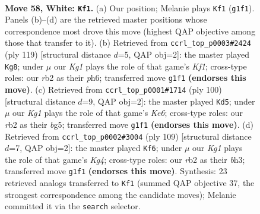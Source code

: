 \documentclass[11pt]{article}
\begin{document}
\clearpage

\begin{figure}[p]\centering
\begin{subfigure}{0.46\textwidth}\centering
\resizebox{\linewidth}{!}{%
\newchessgame
\chessboard[
  setfen={6k1/8/8/4p1p1/5p2/5B2/1r6/6K1 w - - 27 58},
  showmover=false,
  pgfstyle=straightmove, color=movearrow, markmove={g1-f1}
]}
\caption{}
\end{subfigure}\hfill
\begin{subfigure}{0.46\textwidth}\centering
\resizebox{\linewidth}{!}{%
\newchessgame
\chessboard[
  setfen={5k2/8/4K2P/6P1/5P2/8/1b6/8 b - - 0 60},
  showmover=false,
  pgfstyle=straightmove, color=movearrow, markmove={f8-g8}
]}
\caption{}
\end{subfigure}
\\[4pt]
\begin{subfigure}{0.46\textwidth}\centering
\resizebox{\linewidth}{!}{%
\newchessgame
\chessboard[
  setfen={8/7k/4K3/1p4b1/2pB4/8/8/8 w - - 6 51},
  showmover=false,
  pgfstyle=straightmove, color=movearrow, markmove={e6-d5}
]}
\caption{}
\end{subfigure}\hfill
\begin{subfigure}{0.46\textwidth}\centering
\resizebox{\linewidth}{!}{%
\newchessgame
\chessboard[
  setfen={8/8/1b1p4/1P1P2k1/2P5/5K1B/8/8 b - - 0 55},
  showmover=false,
  pgfstyle=straightmove, color=movearrow, markmove={g5-f6}
]}
\caption{}
\end{subfigure}
\caption{\textbf{Move 58, White: \texttt{Kf1}.} (a) Our position; Melanie plays \texttt{Kf1} (\texttt{g1f1}). Panels (b)--(d) are the retrieved master positions whose correspondence most drove this move (highest QAP objective among those that transfer to it). (b) Retrieved from \texttt{ccrl\_top\_p0003\#2424} (ply 119) [structural distance $d$=5, QAP obj=2]: the master played \texttt{Kg8}; under $\mu$ our \emph{Kg1} plays the role of that game's \emph{Kf1}; cross-type roles: our \emph{r}b2 as their \emph{p}h6; transferred move \texttt{g1f1} \textbf{(endorses this move)}. (c) Retrieved from \texttt{ccrl\_top\_p0001\#1714} (ply 100) [structural distance $d$=9, QAP obj=2]: the master played \texttt{Kd5}; under $\mu$ our \emph{Kg1} plays the role of that game's \emph{Ke6}; cross-type roles: our \emph{r}b2 as their \emph{b}g5; transferred move \texttt{g1f1} \textbf{(endorses this move)}. (d) Retrieved from \texttt{ccrl\_top\_p0002\#3004} (ply 109) [structural distance $d$=7, QAP obj=2]: the master played \texttt{Kf6}; under $\mu$ our \emph{Kg1} plays the role of that game's \emph{Kg4}; cross-type roles: our \emph{r}b2 as their \emph{b}h3; transferred move \texttt{g1f1} \textbf{(endorses this move)}. Synthesis: 23 retrieved analogs transferred to \texttt{Kf1} (summed QAP objective 37, the strongest correspondence among the candidate moves); Melanie committed it via the \texttt{search} selector.}
\label{fig:thought-m114}
\end{figure}
\end{document}
